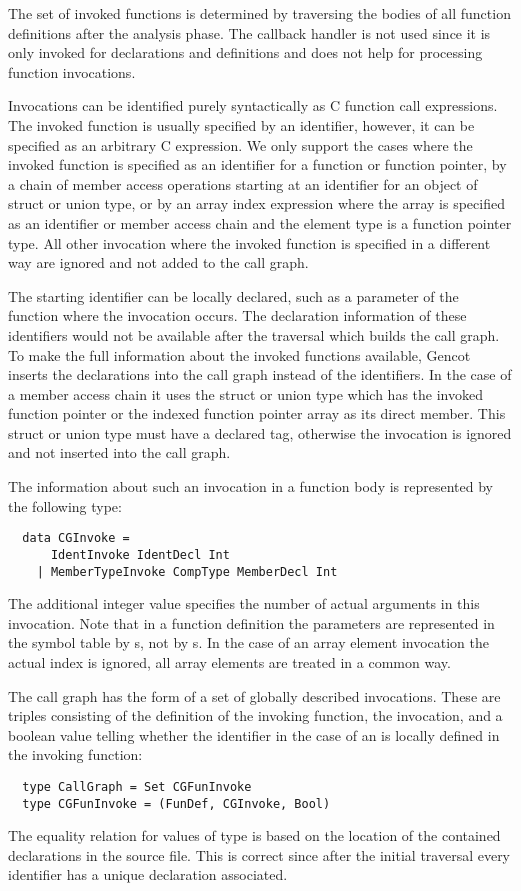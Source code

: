 The set of invoked functions is determined by traversing the bodies of all function definitions after the analysis
phase. The callback handler is not used since it is only invoked for declarations and definitions and does not help
for processing function invocations.

Invocations can be identified purely syntactically as C function call expressions. The invoked function is usually 
specified by an identifier, however, it can be specified as an arbitrary C expression. We only support the cases
where the invoked function is specified as an identifier for a function or function pointer, by a chain of 
member access operations starting at an identifier for an object of struct or union type, or by an array index
expression where the array is specified as an identifier or member access chain and the element type is a function
pointer type. All other invocation where the invoked function is specified in a different way are ignored and not 
added to the call graph.

The starting identifier can be locally declared, such as a parameter of the function where the invocation occurs. The 
declaration information of these identifiers would not be available after the traversal which builds the call graph.
To make the full information about the invoked functions available, Gencot inserts the declarations into the call graph 
instead of the identifiers. In the case of a member access chain it uses the struct or union type which has the 
invoked function pointer or the indexed function pointer array as its direct member. This struct or union type
must have a declared tag, otherwise the invocation is ignored and not inserted into the call graph.

The information about such an invocation in a function body is represented by the following type:
\begin{verbatim}
  data CGInvoke =
      IdentInvoke IdentDecl Int
    | MemberTypeInvoke CompType MemberDecl Int
\end{verbatim}
The additional integer value specifies the number of actual arguments in this invocation.
Note that in a function definition
the parameters are represented in the symbol table by s, not by s. In the case
of an array element invocation the actual index is ignored, all array elements are treated in a common way.

The call graph has the form of a set of globally described invocations. These are triples consisting of the definition
of the invoking function, the invocation, and a boolean value telling whether the identifier in the case of an
 is locally defined in the invoking function:
\begin{verbatim}
  type CallGraph = Set CGFunInvoke
  type CGFunInvoke = (FunDef, CGInvoke, Bool)
\end{verbatim}
The equality relation for values of type  is based on the location of the contained declarations
in the source file. This is correct since after the initial traversal every identifier has a unique declaration associated.

